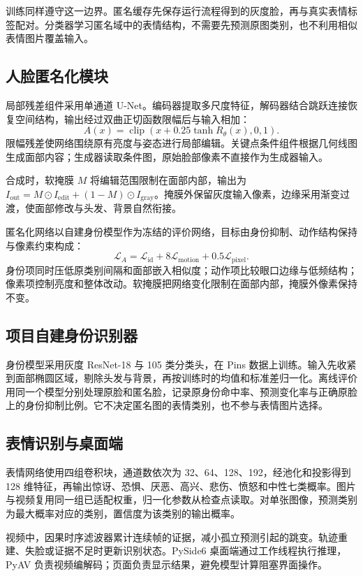 训练同样遵守这一边界。匿名缓存先保存运行流程得到的灰度脸，再与真实表情标签配对。分类器学习匿名域中的表情结构，不需要先预测原图类别，也不利用相似表情图片覆盖输入。

\subsection{人脸匿名化模块}
局部残差组件采用单通道 U-Net。编码器提取多尺度特征，解码器结合跳跃连接恢复空间结构，输出经过双曲正切函数限幅后与输入相加：
\begin{equation}
 A(x)=\operatorname{clip}\!\left(x+0.25\tanh R_\theta(x),0,1\right).
\label{eq:residual}
\end{equation}
限幅残差使网络围绕原有亮度与姿态进行局部编辑。关键点条件组件根据几何线图生成面部内容；生成器读取条件图，原始脸部像素不直接作为生成器输入。

合成时，软掩膜 $M$ 将编辑范围限制在面部内部，输出为 $I_{\mathrm{out}}=M\odot I_{\mathrm{edit}}+(1-M)\odot I_{\mathrm{gray}}$。掩膜外保留灰度输入像素，边缘采用渐变过渡，使面部修改与头发、背景自然衔接。

匿名化网络以自建身份模型作为冻结的评价网络，目标由身份抑制、动作结构保持与像素约束构成：
\begin{equation}
\mathcal{L}_{A}=\mathcal{L}_{\mathrm{id}}+8\mathcal{L}_{\mathrm{motion}}+0.5\mathcal{L}_{\mathrm{pixel}}.
\end{equation}
身份项同时压低原类别间隔和面部嵌入相似度；动作项比较眼口边缘与低频结构；像素项控制亮度和整体改动。软掩膜把网络变化限制在面部内部，掩膜外像素保持不变。

\subsection{项目自建身份识别器}
身份模型采用灰度 ResNet-18 与 105 类分类头，在 Pins 数据上训练。输入先收紧到面部椭圆区域，剔除头发与背景，再按训练时的均值和标准差归一化。离线评价用同一个模型分别处理原脸和匿名脸，记录原身份命中率、预测变化率与正确原脸上的身份抑制比例。它不决定匿名图的表情类别，也不参与表情图片选择。

\subsection{表情识别与桌面端}
表情网络使用四组卷积块，通道数依次为 32、64、128、192，经池化和投影得到 128 维特征，再输出惊讶、恐惧、厌恶、高兴、悲伤、愤怒和中性七类概率。图片与视频复用同一组已适配权重，归一化参数从检查点读取。对单张图像，预测类别为最大概率对应的类别，置信度为该类别的输出概率。

视频中，因果时序滤波器累计连续帧的证据，减小孤立预测引起的跳变。轨迹重建、失脸或证据不足时更新识别状态。PySide6 桌面端通过工作线程执行推理，PyAV 负责视频编解码；页面负责显示结果，避免模型计算阻塞界面操作。
